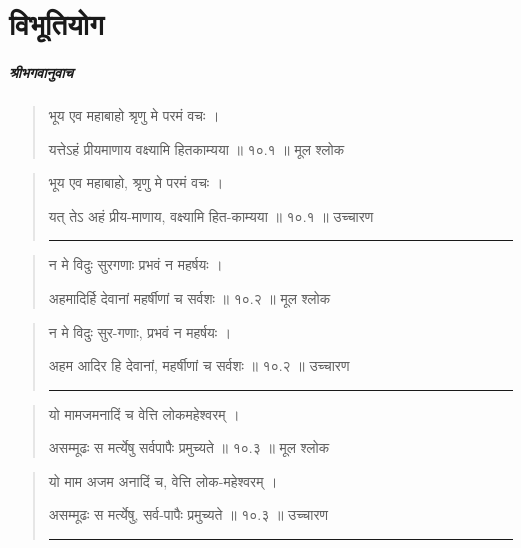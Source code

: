 \chapter{\sanskrit विभूतियोग} 

\paragraph{\sanskrit श्रीभगवानुवाच}
\begin{quotation} 

भूय एव महाबाहो श्रृणु मे परमं वचः  ।  

यत्तेऽहं प्रीयमाणाय वक्ष्यामि हितकाम्यया  ॥ १०.१ ॥  मूल श्लोक
\end{quotation}

\begin{quotation}

भूय एव महाबाहो, श्रृणु मे परमं वचः  ।  

यत् तेऽ अहं प्रीय-माणाय, वक्ष्यामि हित-काम्यया  ॥ १०.१ ॥  उच्चारण

\noindent\rule{16cm}{0.4pt} 
\end{quotation}


\begin{quotation} 

न मे विदुः सुरगणाः प्रभवं न महर्षयः  ।  

अहमादिर्हि देवानां महर्षीणां च सर्वशः  ॥ १०.२ ॥  मूल श्लोक
\end{quotation}

\begin{quotation}

न मे विदुः सुर-गणाः, प्रभवं न महर्षयः  ।  

अहम आदिर हि देवानां, महर्षीणां च सर्वशः  ॥ १०.२ ॥  उच्चारण

\noindent\rule{16cm}{0.4pt} 
\end{quotation}


\begin{quotation} 

यो मामजमनादिं च वेत्ति लोकमहेश्वरम्‌  ।  

असम्मूढः स मर्त्येषु सर्वपापैः प्रमुच्यते  ॥ १०.३ ॥  मूल श्लोक
\end{quotation}

\begin{quotation}

यो माम अजम अनादिं च, वेत्ति लोक-महेश्वरम्‌  ।  

असम्मूढः स मर्त्येषु, सर्व-पापैः प्रमुच्यते  ॥ १०.३ ॥  उच्चारण

\noindent\rule{16cm}{0.4pt} 
\end{quotation}


